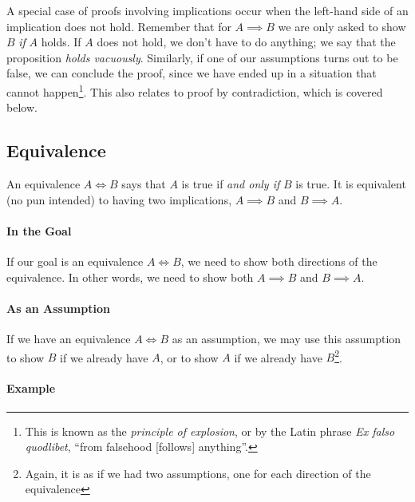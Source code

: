 \documentclass{tufte-handout}
\begin{document}
A special case of proofs involving implications occur when the
left-hand side of an implication does not hold. Remember that for
$A \implies B$ we are only asked to show $B$ \emph{if} $A$ holds.
If $A$ does not hold, we don't have to do anything; we say that
the proposition \emph{holds vacuously}. Similarly, if one of our
assumptions turns out to be false, we can conclude the proof,
since we have ended up in a situation that cannot
happen\footnote{This is known as the \emph{principle of
    explosion}, or by the Latin phrase \emph{Ex falso quodlibet},
  ``from falsehood [follows] anything''.}. This also relates to
proof by contradiction, which is covered below.


\subsection{Equivalence}

An equivalence $A \iff B$ says that $A$ is true if \emph{and only
  if} $B$ is true. It is equivalent (no pun intended) to having
two implications, $A \implies B$ and $B \implies A$.

\paragraph{In the Goal}
If our goal is an equivalence $A \iff B$, we need to show both
directions of the equivalence. In other words, we need to show
both $A \implies B$ and $B \implies A$.

\paragraph{As an Assumption}
If we have an equivalence $A \iff B$ as an assumption, we may use
this assumption to show $B$ if we already have $A$, or to show $A$
if we already have $B$\footnote{Again, it is as if we had two
  assumptions, one for each direction of the equivalence}.

\paragraph{Example}
\end{document}
